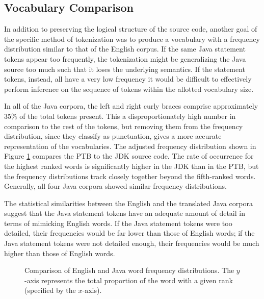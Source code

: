\documentclass[runningheads,a4paper]{llncs}
\begin{document}
\subsection{Vocabulary Comparison}

In addition to preserving the logical structure of the source code,
another goal of the specific method of tokenization was to
produce a vocabulary with a frequency distribution similar to that of
the English corpus. If the same
Java statement tokens appear too frequently, the tokenization might be
generalizing the Java source too much such that it loses the underlying
semantics. If the statement tokens, instead, all have a very low frequency
it would be difficult to effectively perform inference on the sequence of 
tokens within the allotted vocabulary size.

In all of the Java corpora, the left and right curly braces comprise
approximately $35\%$
of the total tokens present. This a disproportionately high number in
comparison to the rest of the tokens, but removing them from the frequency
distribution, since they classify as punctuation, gives a more accurate
representation of the vocabularies. The adjusted frequency distribution
shown in Figure \ref{english-frequency} compares the PTB to the
JDK source code. The rate of occurrence for the highest
ranked words is significantly higher in the JDK than in the PTB, but
the frequency distributions track closely together beyond the fifth-ranked
words.
Generally, all four Java corpora showed similar frequency distributions.

The statistical similarities between the English and the translated Java
corpora suggest that the Java statement tokens have an adequate amount of
detail in terms of mimicking English words. If the Java statement tokens
were too detailed, their frequencies would be far lower than those of English
words; if the Java statement tokens were not detailed enough, their
frequencies would be much higher than those of English words.

\begin{figure}
\centering
{} 
\caption{Comparison of English and Java word frequency distributions.
    The $y$-axis represents the total proportion of the word with a given
    rank (specified by the $x$-axis).}
\label{english-frequency}
\end{figure}
 
\end{document}
